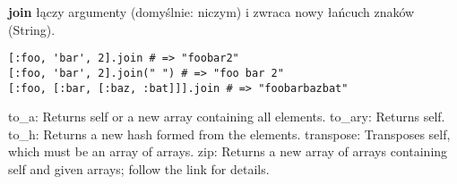 \textbf{join} łączy argumenty (domyślnie: niczym) i zwraca nowy łańcuch znaków (String).
\begin{verbatim}
[:foo, 'bar', 2].join # => "foobar2"
[:foo, 'bar', 2].join(" ") # => "foo bar 2"
[:foo, [:bar, [:baz, :bat]]].join # => "foobarbazbat"
\end{verbatim}

{\footnotesize
to\_a: Returns self or a new array containing all elements.
to\_ary: Returns self.
to\_h: Returns a new hash formed from the elements.
transpose: Transposes self, which must be an array of arrays.
zip: Returns a new array of arrays containing self and given arrays; follow the link for details.
}